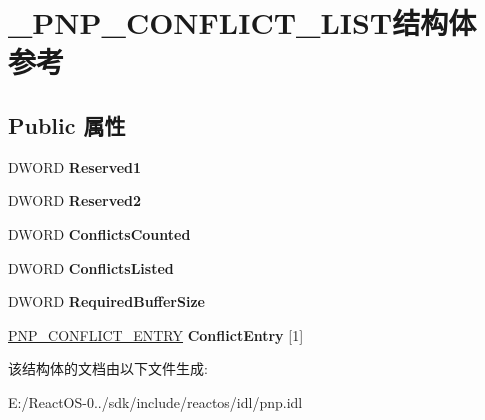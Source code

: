 \hypertarget{struct___p_n_p___c_o_n_f_l_i_c_t___l_i_s_t}{}\section{\+\_\+\+P\+N\+P\+\_\+\+C\+O\+N\+F\+L\+I\+C\+T\+\_\+\+L\+I\+S\+T结构体 参考}
\label{struct___p_n_p___c_o_n_f_l_i_c_t___l_i_s_t}
\subsection*{Public 属性}
\begin{DoxyCompactItemize}
\item 
\mbox{\label{struct___p_n_p___c_o_n_f_l_i_c_t___l_i_s_t_a2cc06f67055968d8da8d6e0b2e960caf}} 
D\+W\+O\+RD {\bfseries Reserved1}
\item 
\mbox{\label{struct___p_n_p___c_o_n_f_l_i_c_t___l_i_s_t_a72a4894ad199d7a71d404ed65ed78f6a}} 
D\+W\+O\+RD {\bfseries Reserved2}
\item 
\mbox{\label{struct___p_n_p___c_o_n_f_l_i_c_t___l_i_s_t_ae9b91662478b7b3cfbbcc853069cfc91}} 
D\+W\+O\+RD {\bfseries Conflicts\+Counted}
\item 
\mbox{\label{struct___p_n_p___c_o_n_f_l_i_c_t___l_i_s_t_affb90e30c409e2d0f7676e48952ef686}} 
D\+W\+O\+RD {\bfseries Conflicts\+Listed}
\item 
\mbox{\label{struct___p_n_p___c_o_n_f_l_i_c_t___l_i_s_t_aa75935a38bdb5e814850d6ecea50c22e}} 
D\+W\+O\+RD {\bfseries Required\+Buffer\+Size}
\item 
\mbox{\label{struct___p_n_p___c_o_n_f_l_i_c_t___l_i_s_t_a8977c29e6bfe8c572b45329311bb73bc}} 
\hyperlink{struct___p_n_p___c_o_n_f_l_i_c_t___e_n_t_r_y}{P\+N\+P\+\_\+\+C\+O\+N\+F\+L\+I\+C\+T\+\_\+\+E\+N\+T\+RY} {\bfseries Conflict\+Entry} \mbox{[}1\mbox{]}
\end{DoxyCompactItemize}


该结构体的文档由以下文件生成\+:\begin{DoxyCompactItemize}
\item 
E\+:/\+React\+O\+S-\/0../sdk/include/reactos/idl/pnp.\+idl\end{DoxyCompactItemize}
